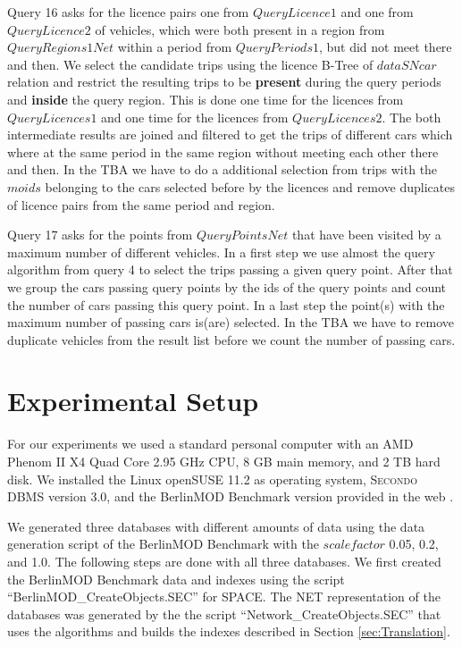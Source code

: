 \documentclass[a4paper]{article}
\newcommand{\secondo}{\textsc{Secondo}}
\newcommand{\bmodb} {BerlinMOD Benchmark}
\newcommand{\op}[1]{\textbf{#1}}
\begin{document}
Query 16 asks for the licence pairs one from $QueryLicence1$ and one from $QueryLicence2$
of vehicles, which were both present in a region from $QueryRegions1Net$ within a period
from $QueryPeriods1$, but did not meet there and then. We select the candidate trips
using the licence B-Tree of $dataSNcar$ relation and restrict the resulting trips to be
\op{present} during the query periods and \op{inside} the query region. This is done
one time for the licences from $QueryLicences1$ and one time for the licences from
$QueryLicences2$. The both intermediate results are joined and filtered to get the
trips of different cars which where at the same period in the same region
without meeting each other there and then. In the TBA we have
to do a additional selection from trips with the $moids$ belonging to the cars
selected before by the licences and remove duplicates of licence pairs from the
same period and region.

Query 17 asks for the points from $QueryPointsNet$ that have been visited by a
maximum number of different vehicles. In a first step we use almost the query
algorithm from query 4 to select the trips passing a given query
point. After that we group the cars passing query points by the ids of the
query points and count the number of cars passing this query point. In a last
step the point(s) with the maximum number of passing cars is(are) selected.
In the TBA we have to remove duplicate vehicles from the result list before we
count the number of passing cars.
\section{Experimental Setup}
\label{sec:scenario}
For our experiments we used a standard personal computer with an AMD Phenom II X4
Quad Core 2.95 GHz CPU, 8 GB main memory, and 2 TB hard disk. We installed the
Linux openSUSE 11.2 as operating system, \secondo{} DBMS version 3.0, and
the \bmodb{} version provided in the web \cite{NetworkWeb}.

We generated three databases with different amounts of data using the data generation
script of the \bmodb{} with the $scalefactor$ 0.05, 0.2, and 1.0. The following
steps are done with all three databases. We first created the \bmodb{} data and indexes
using the script ``BerlinMOD\_CreateObjects.SEC'' for SPACE. The NET
representation of the databases was generated by the the script ``Network\_CreateObjects.SEC''
that uses the algorithms and builds the indexes described in Section \ref{sec:Translation}.
\end{document}
